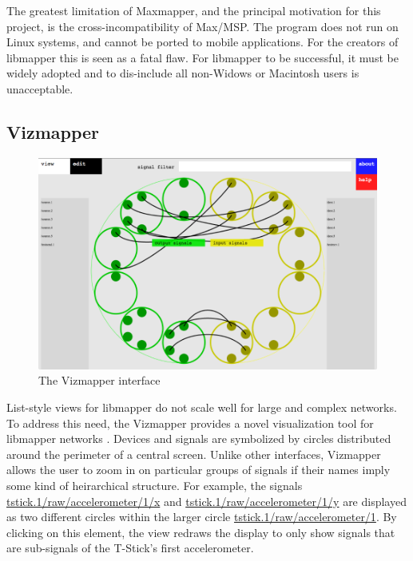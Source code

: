The greatest limitation of Maxmapper, and the principal motivation for this project, is the cross-incompatibility of Max/MSP. The program does not run on Linux systems, and cannot be ported to mobile applications. For the creators of libmapper this is seen as a fatal flaw. For libmapper to be successful, it must be widely adopted and to dis-include all non-Widows or Macintosh users is unacceptable.

	\subsection{Vizmapper} %
	\label{sub:vizmapper}

\begin{figure}[ht]
	\centering
	\includegraphics[width=\textwidth]{figures/vizmapper2}
	\caption{The Vizmapper interface}
	\label{fig:vizmapper}
\end{figure}

List-style views for libmapper do not scale well for large and complex networks. To address this need, the Vizmapper provides a novel visualization tool for libmapper networks \cite{vizmapper}. Devices and signals are symbolized by circles distributed around the perimeter of a central screen. Unlike other interfaces, Vizmapper allows the user to zoom in on particular groups of signals if their names imply some kind of heirarchical structure. For example, the signals \url{tstick.1/raw/accelerometer/1/x} and \url{tstick.1/raw/accelerometer/1/y} are displayed as two different circles within the larger circle \url{tstick.1/raw/accelerometer/1}. By clicking on this element, the view redraws the display to only show signals that are sub-signals of the T-Stick's first accelerometer. 

